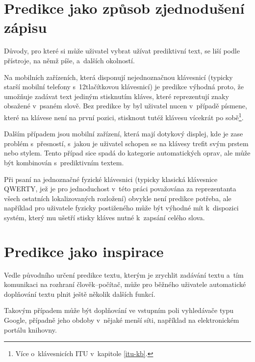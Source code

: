 \documentclass[a4paper,11pt,openany]{book} %
\begin{document}
\section{Predikce jako způsob zjednodušení zápisu}

Důvody, pro které si může uživatel vybrat užívat prediktivní text, se liší podle přístroje, na němž píše, a~dalších okolností.

Na mobilních zařízeních, která disponují nejednoznačnou klávesnicí (typicky starší mobilní telefony s~12tlačítkovou klávesnicí) je predikce výhodná proto, že umožňuje zadávat text jediným stisknutím kláves, které reprezentují znaky obsažené v~psaném slově. Bez predikce by byl uživatel nucen v~případě písmene, které na klávese není na první pozici, stisknout tutéž klávesu vícekrát po sobě\footnote{Více o~klávesnicích ITU v~kapitole \ref{itu-kb}.}.

Dalším případem jsou mobilní zařízení, která mají dotykový displej, kde je zase problém s~přesností, s~jakou je uživatel schopen se na klávesy trefit svým prstem nebo stylem. Tento případ sice spadá do kategorie automatických oprav, ale může být kombinován s~prediktivním textem. \parencite{kocienda2012method} %

Při psaní na jednoznačné fyzické klávesnici (typicky klasická klávesnice QWERTY, jež je pro jednoduchost v~této práci považována za reprezentanta všech ostatních lokalizovaných rozložení) obvykle není predikce potřeba, ale například pro uživatele fyzicky postiženého může být výhodné mít k~dispozici systém, který mu ušetří stisky kláves nutné k~zapsání celého slova.

\section{Predikce jako inspirace}

Vedle původního určení predikce textu, kterým je zrychlit zadávání textu a~tím komunikaci na rozhraní člověk--počítač, může pro běžného uživatele automatické doplňování textu plnit ještě několik dalších funkcí.

Takovým případem může být doplňování ve vstupním poli vyhledávače typu Google, případně jeho obdoby v~nějaké menší síti, například na elektronickém portálu knihovny. \parencite{google2015}
\end{document}
